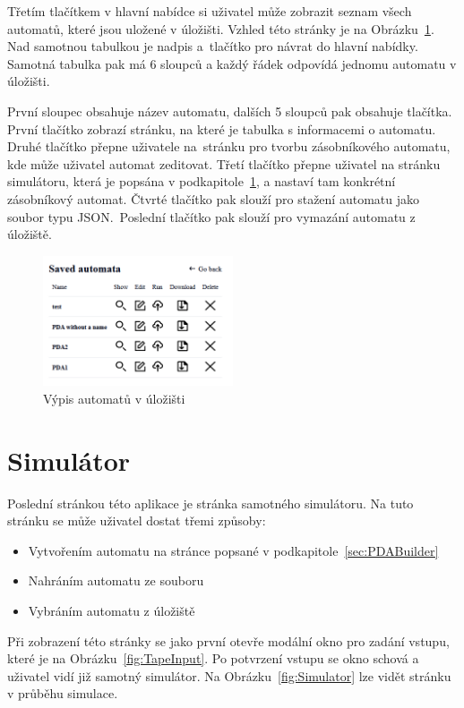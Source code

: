 Třetím tlačítkem v hlavní nabídce si uživatel může zobrazit seznam všech automatů, které jsou uložené v úložišti. Vzhled této stránky je na Obrázku~\ref{fig:Storage}. Nad samotnou tabulkou je nadpis a~tlačítko pro návrat do hlavní nabídky. Samotná tabulka pak má 6 sloupců a každý řádek odpovídá jednomu automatu v úložišti.

První sloupec obsahuje název automatu, dalších 5 sloupců pak obsahuje tlačítka. První tlačítko zobrazí stránku, na které je tabulka s informacemi o automatu. Druhé tlačítko přepne uživatele na~stránku pro tvorbu zásobníkového automatu, kde může uživatel automat zeditovat. Třetí tlačítko přepne uživatel na stránku simulátoru, která je popsána v podkapitole~\ref{sec:SimulatorPage}, a nastaví tam konkrétní zásobníkový automat. Čtvrté tlačítko pak slouží pro stažení automatu jako soubor typu JSON.\ Poslední tlačítko pak slouží pro vymazání automatu z úložiště.

\begin{figure}[h]
    \centering
    \includegraphics[width=0.5\textwidth]{Figures/PrntScrn_UI_Storage.png}
    \caption{Výpis automatů v úložišti}\label{fig:Storage}
\end{figure}

\section{Simulátor}\label{sec:SimulatorPage}

Poslední stránkou této aplikace je stránka samotného simulátoru. Na tuto stránku se může uživatel dostat třemi způsoby:

\begin{itemize}
    \item Vytvořením automatu na stránce popsané v podkapitole~\ref{sec:PDABuilder}
    \item Nahráním automatu ze souboru
    \item Vybráním automatu z úložiště
\end{itemize}

Při zobrazení této stránky se jako první otevře modální okno pro zadání vstupu, které je na Obrázku~\ref{fig:TapeInput}. Po potvrzení vstupu se okno schová a uživatel vidí již samotný simulátor. Na Obrázku~\ref{fig:Simulator} lze vidět stránku v průběhu simulace.

